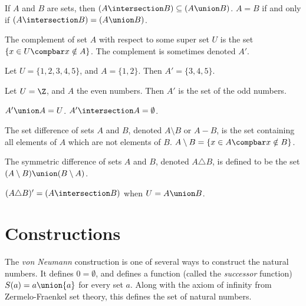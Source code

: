 \documentclass[12pt]{article}
\begin{document}
\begin{rmk}
    If $A$ and $B$ are sets, then $(A \intersection B) \subseteq (A \union B)$. $A = B$ if and only if $(A \intersection B) = (A \union B)$.
\end{rmk}

\begin{defn}
    The complement of set $A$ with respect to some super set $U$ is the set $\left\{x \in U \compbar x \notin A\right\}$. The complement is sometimes denoted $A'$.
\end{defn}

\begin{exmp}
    Let $U = \{1, 2, 3, 4, 5\}$, and $A = \{1, 2\}$. Then $A' = \{3, 4, 5\}$.
\end{exmp}

\begin{exmp}
    Let $U = \Z$, and $A$ the even numbers. Then $A'$ is the set of the odd numbers.
\end{exmp}

\begin{rmk}
    $A' \union A = U$. $A' \intersection A = \emptyset$.
\end{rmk}

\begin{defn}\label{set-difference}
    The set difference of sets $A$ and  $B$, denoted $A \setminus B$ or $A - B$, is the set containing all elements of $A$ which are not elements of $B$. $A \setminus B = \left\{x \in A \compbar x \notin B\right\}$.
\end{defn}

\begin{defn}\label{symmetric-difference}
    The symmetric difference of sets $A$ and $B$, denoted $A \triangle B$, is defined to be the set $(A \setminus B) \union (B \setminus A)$.
\end{defn}

\begin{rmk}
    $(A \triangle B)' = (A \intersection B)$ when $U = A \union B$.
\end{rmk}

\section{Constructions}

The \emph{von Neumann} construction is one of several ways to construct the natural numbers. It defines $0 = \emptyset$, and defines a function (called the \emph{successor} function) $S(a) = a \union \{a\}$ for every set $a$. Along with the axiom of infinity from Zermelo-Fraenkel set theory, this defines the set of natural numbers.
\end{document}
